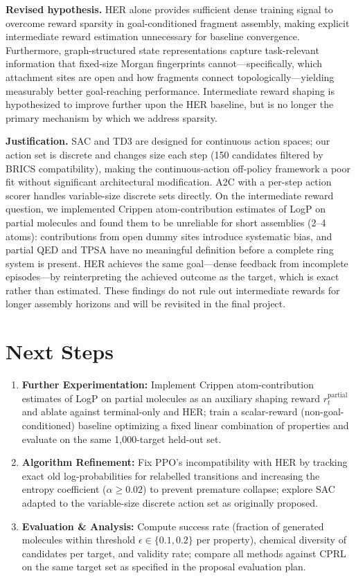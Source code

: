 \documentclass{article}
\begin{document}
\textbf{Revised hypothesis.}
HER alone provides sufficient dense training signal to overcome reward sparsity in goal-conditioned fragment assembly, making explicit intermediate reward estimation unnecessary for baseline convergence.
Furthermore, graph-structured state representations capture task-relevant information that fixed-size Morgan fingerprints cannot---specifically, which attachment sites are open and how fragments connect topologically---yielding measurably better goal-reaching performance.
Intermediate reward shaping is hypothesized to improve further upon the HER baseline, but is no longer the primary mechanism by which we address sparsity.

\textbf{Justification.}
SAC and TD3 are designed for continuous action spaces; our action set is discrete and changes size each step (150 candidates filtered by BRICS compatibility), making the continuous-action off-policy framework a poor fit without significant architectural modification.
A2C with a per-step action scorer handles variable-size discrete sets directly.
On the intermediate reward question, we implemented Crippen atom-contribution estimates of LogP on partial molecules and found them to be unreliable for short assemblies (2--4 atoms): contributions from open dummy sites introduce systematic bias, and partial QED and TPSA have no meaningful definition before a complete ring system is present.
HER achieves the same goal---dense feedback from incomplete episodes---by reinterpreting the achieved outcome as the target, which is exact rather than estimated.
These findings do not rule out intermediate rewards for longer assembly horizons and will be revisited in the final project.

\section{Next Steps}

\begin{enumerate}[leftmargin=*]
    \item \textbf{Further Experimentation:} Implement Crippen atom-contribution estimates of LogP on partial molecules as an auxiliary shaping reward $r_t^{\mathrm{partial}}$ and ablate against terminal-only and HER; train a scalar-reward (non-goal-conditioned) baseline optimizing a fixed linear combination of properties and evaluate on the same 1{,}000-target held-out set.
    \item \textbf{Algorithm Refinement:} Fix PPO's incompatibility with HER by tracking exact old log-probabilities for relabelled transitions and increasing the entropy coefficient ($\alpha \geq 0.02$) to prevent premature collapse; explore SAC adapted to the variable-size discrete action set as originally proposed.
    \item \textbf{Evaluation \& Analysis:} Compute success rate (fraction of generated molecules within threshold $\epsilon \in \{0.1, 0.2\}$ per property), chemical diversity of candidates per target, and validity rate; compare all methods against CPRL on the same target set as specified in the proposal evaluation plan.
\end{enumerate}
\end{document}
